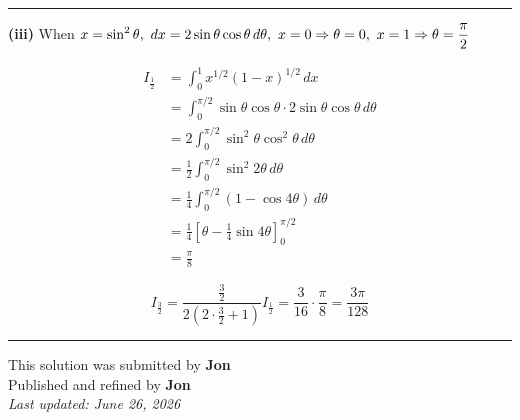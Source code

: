 \documentclass[12pt]{article}
\begin{document}
\bigskip\hrule\bigskip

\textbf{(iii)} When $\displaystyle x=\sin^2\theta, \ dx=2\sin\theta\cos\theta\,d\theta,\  x=0\Rightarrow \theta=0,\  x=1\Rightarrow \theta=\frac{\pi}{2}$

\begin{align*}
I_{\frac12}
&=\int_0^1 x^{1/2}(1-x)^{1/2}\,dx\\
&=\int_0^{\pi/2}\sin\theta\cos\theta\cdot2\sin\theta\cos\theta\,d\theta\\
&=2\int_0^{\pi/2}\sin^2\theta\cos^2\theta\,d\theta\\
&=\frac12\int_0^{\pi/2}\sin^2 2\theta\,d\theta\\
&=\frac14\int_0^{\pi/2}(1-\cos4\theta)\,d\theta\\
&=\frac14\left[\theta-\frac14\sin4\theta\right]_0^{\pi/2}\\
&=\frac{\pi}{8}
\end{align*}

$$I_{\frac32}=\frac{\frac32}{2(2\cdot\frac32+1)}I_{\frac12}=\frac{3}{16}\cdot\frac{\pi}{8}=\frac{3\pi}{128}$$

\bigskip
\hrule
\begin{center}
    This solution was submitted by \textbf{Jon}\\[4pt]
    Published and refined by \textbf{Jon}\\[8pt]
    \textit{Last updated: June 26, 2026}
\end{center}
\end{document}
